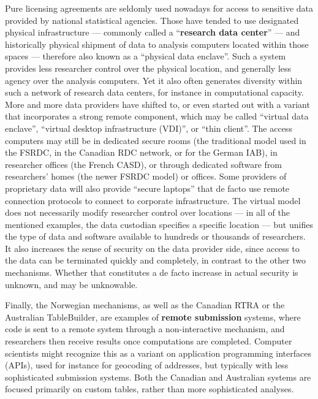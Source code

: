 Pure licensing agreements are seldomly used nowadays for access to sensitive data provided by national statistical agencies. Those have tended to use designated physical infrastructure --- commonly called a ``\textbf{research data center}'' --- and historically physical shipment of data to analysis computers located within those spaces \cite{currie2015social}  --- therefore also known as a ``physical data enclave''. Such a system provides less researcher control over the physical location, and generally less agency over the analysis computers. Yet it also often generates diversity within such a network of research data centers, for instance in computational capacity. More and more data providers have shifted to, or even started out with a variant that incorporates a strong remote component, which may be called ``virtual data enclave'', ``virtual desktop infrastructure (VDI)'', or ``thin client''. The access computers may still be in dedicated secure rooms (the traditional model used in the FSRDC, in the Canadian RDC network, or for the German \ac{IAB}), in researcher offices (the French \acf{CASD}), or through dedicated software from researchers' homes (the newer FSRDC model) or offices. Some providers of proprietary data will also provide ``secure laptops'' that de facto use remote connection protocols to connect to corporate infrastructure. The virtual model does not necessarily modify researcher control over locations --- in all of the mentioned examples, the data custodian specifies a specific location --- but unifies the type of data and software available to hundreds or thousands of researchers. It also increases the sense of security on the data provider side, since access to the data can be terminated quickly and completely, in contrast to the other two mechanisms. Whether that constitutes a de facto increase in actual security is unknown, and may be unknowable. 

Finally, the Norwegian mechanisms, as well as the Canadian RTRA \citep{statistics_canada_real_2021} or the Australian TableBuilder, are examples of \textbf{remote submission} systems, where code is sent to a remote system through a non-interactive mechanism, and researchers then receive results once computations are completed. Computer scientists might recognize this as a variant on application programming interfaces (APIs), used for instance for geocoding of addresses, but typically with less sophisticated submission systems. Both the Canadian and Australian systems are focused primarily on custom tables, rather than more sophisticated analyses.

